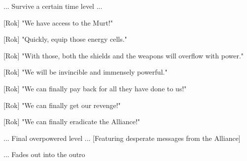 \documentclass[a4paper,12pt]{article}
\begin{document}
... Survive a certain time level ...

[Rok] "We have access to the Murt!" 

[Rok] "Quickly, equip those energy cells." 

[Rok] "With those, both the shields and the weapons will overflow with power." 

[Rok] "We will be invincible and immensely powerful."

[Rok] "We can finally pay back for all they have done to us!" 

[Rok] "We can finally get our revenge!"

[Rok] "We can finally eradicate the Alliance!"

... Final overpowered level ... [Featuring desperate messages from the Alliance]

... Fades out into the outro
\end{document}

